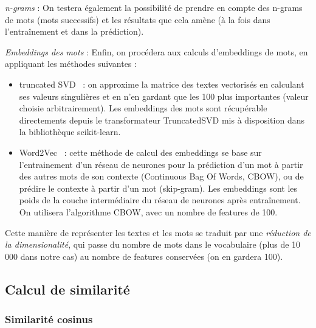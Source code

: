         \emph{n-grams} : 
        On testera également la possibilité de prendre en compte des n-grams de mots (mots successifs) et les résultats que cela amène (à la fois dans l'entraînement et dans la prédiction).

        \emph{Embeddings des mots} : 
        Enfin, on procédera aux calculs d'embeddings de mots, en appliquant les méthodes suivantes :
        \begin{itemize}
            \item truncated SVD~\cite{LSA_wiki} : on approxime la matrice des textes vectorisés en calculant ses valeurs singulières et en n'en gardant que les 100 plus importantes (valeur choisie arbitrairement). Les embeddings des mots sont récupérable directements depuis le transformateur TruncatedSVD mis à disposition dans la bibliothèque scikit-learn.
            \item Word2Vec~\cite{word2vec_wiki} : cette méthode de calcul des embeddings se base sur l'entrainement d'un réseau de neurones pour la prédiction d'un mot à partir des autres mots de son contexte (Continuous Bag Of Words, CBOW), ou de prédire le contexte à partir d'un mot (skip-gram). Les embeddings sont les poids de la couche intermédiaire du réseau de neurones après entraînement. On utilisera l'algorithme CBOW, avec un nombre de features de 100.
        \end{itemize}
        Cette manière de représenter les textes et les mots se traduit par une \emph{réduction de la dimensionalité}, qui passe du nombre de mots dans le vocabulaire (plus de 10 000 dans notre cas) au nombre de features conservées (on en gardera 100).

        \subsection{Calcul de similarité}

            \subsubsection{Similarité cosinus}
            \label{similarite_cosinus}

